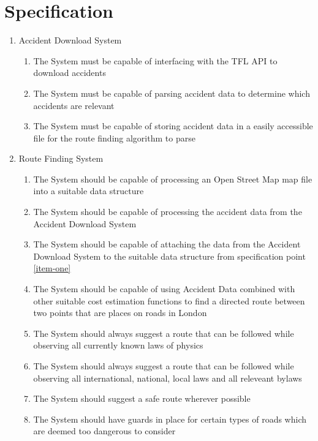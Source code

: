 \documentclass[11pt,twoside,a4paper]{report}
\begin{document}
\section{Specification}
\begin{enumerate}
\item Accident Download System
\begin{enumerate}[label=\arabic{enumi}.\arabic*]
    \item \label{downloadaccidents}The System must be capable of interfacing with the TFL API to download accidents
    \item \label{parseaccidents}The System must be capable of parsing accident data to determine which accidents are relevant
    \item \label{storeaccidents}The System must be capable of storing accident data in a easily accessible file for the route finding algorithm to parse
\end{enumerate} 
\item Route Finding System
\begin{enumerate}[label=\arabic{enumi}.\arabic*]
    \item \label{item-one} The System should be capable of processing an Open Street Map map file into a suitable data structure
    \item \label{item-two}The System should be capable of processing the accident data from the Accident Download System
    \item \label{item-three}The System should be capable of attaching the data from the Accident Download System to the suitable data structure from specification point \ref{item-one}
    \item \label{item-four}The System should be capable of using Accident Data combined with other suitable cost estimation functions to find a directed route between two points that are places on roads in London
    \item \label{item-five}The System should always suggest a route that can be followed while observing all currently known laws of physics
    \item \label{item-six}The System should always suggest a route that can be followed while observing all international, national, local laws and all releveant bylaws
    \item \label{item-seven}The System should suggest a safe route wherever possible
    \item \label{item-eight}The System should have guards in place for certain types of roads which are deemed too dangerous to consider

\end{enumerate}
\end{enumerate}
\end{document}
